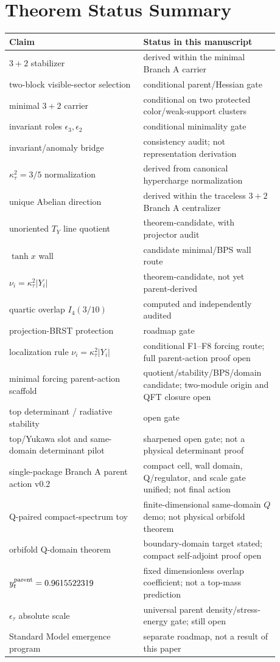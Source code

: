 \documentclass[11pt]{article}
\begin{document}
\section{Theorem Status Summary}
\begin{center}
\begin{tabular}{p{0.46\linewidth}p{0.42\linewidth}}
\toprule
\textbf{Claim} & \textbf{Status in this manuscript}\\
\midrule
$3+2$ stabilizer & derived within the minimal Branch A carrier\\
two-block visible-sector selection & conditional parent/Hessian gate\\
minimal $3+2$ carrier & conditional on two protected color/weak-support clusters\\
invariant roles $\epsilon_3,\epsilon_2$ & conditional minimality gate\\
invariant/anomaly bridge & consistency audit; not representation derivation\\
$\kappa_\tau^2=3/5$ normalization & derived from canonical hypercharge normalization\\
unique Abelian direction & derived within the traceless $3+2$ Branch A centralizer\\
unoriented $T_Y$ line quotient & theorem-candidate, with projector audit\\
$\tanh x$ wall & candidate minimal/BPS wall route\\
$\nu_i=\kappa_\tau^2|Y_i|$ & theorem-candidate, not yet parent-derived\\
quartic overlap $I_4(3/10)$ & computed and independently audited\\
projection-BRST protection & roadmap gate\\
localization rule $\nu_i=\kappa_\tau^2|Y_i|$ & conditional F1--F8 forcing route; full parent-action proof open\\
minimal forcing parent-action scaffold & quotient/stability/BPS/domain candidate; two-module origin and QFT closure open\\
top determinant / radiative stability & open gate\\
top/Yukawa slot and same-domain determinant pilot & sharpened open gate; not a physical determinant proof\\
single-package Branch A parent action v0.2 & compact cell, wall domain, Q/regulator, and scale gate unified; not final action\\
Q-paired compact-spectrum toy & finite-dimensional same-domain $Q$ demo; not physical orbifold theorem\\
orbifold Q-domain theorem & boundary-domain target stated; compact self-adjoint proof open\\
$y_t^{\rm parent}=0.9615522319$ & fixed dimensionless overlap coefficient; not a top-mass prediction\\
$\epsilon_\tau$ absolute scale & universal parent density/stress-energy gate; still open\\
Standard Model emergence program & separate roadmap, not a result of this paper\\
\bottomrule
\end{tabular}
\end{center}
\end{document}
